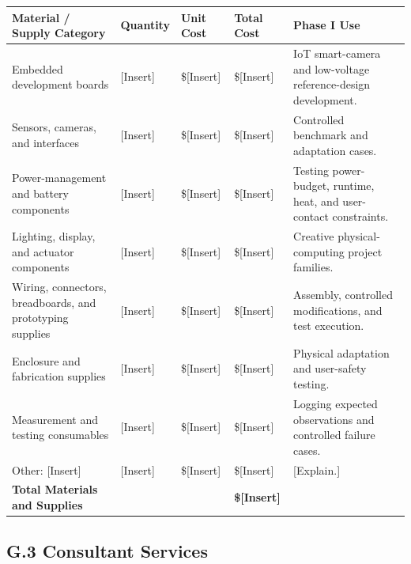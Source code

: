 \documentclass[11pt,letterpaper]{article}
\begin{document}
\begin{table}[htbp]
\centering
\renewcommand{\arraystretch}{1.25}
\begin{tabularx}{\textwidth}{
    p{}
    p{}
    p{}
    p{}
    X
}
\toprule
\textbf{Material / Supply Category} &
\textbf{Quantity} &
\textbf{Unit Cost} &
\textbf{Total Cost} &
\textbf{Phase I Use} \\
\midrule

Embedded development boards &
[Insert] &
\$[Insert] &
\$[Insert] &
IoT smart-camera and low-voltage reference-design development. \\

Sensors, cameras, and interfaces &
[Insert] &
\$[Insert] &
\$[Insert] &
Controlled benchmark and adaptation cases. \\

Power-management and battery components &
[Insert] &
\$[Insert] &
\$[Insert] &
Testing power-budget, runtime, heat, and user-contact constraints. \\

Lighting, display, and actuator components &
[Insert] &
\$[Insert] &
\$[Insert] &
Creative physical-computing project families. \\

Wiring, connectors, breadboards, and prototyping supplies &
[Insert] &
\$[Insert] &
\$[Insert] &
Assembly, controlled modifications, and test execution. \\

Enclosure and fabrication supplies &
[Insert] &
\$[Insert] &
\$[Insert] &
Physical adaptation and user-safety testing. \\

Measurement and testing consumables &
[Insert] &
\$[Insert] &
\$[Insert] &
Logging expected observations and controlled failure cases. \\

Other: [Insert] &
[Insert] &
\$[Insert] &
\$[Insert] &
[Explain.] \\

\midrule
\textbf{Total Materials and Supplies} &
&
&
\textbf{\$[Insert]} &
\\
\bottomrule
\end{tabularx}
\end{table}

\subsection*{G.3 Consultant Services}
\end{document}
